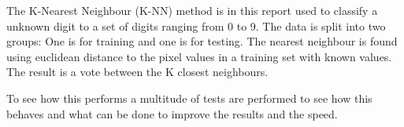 

The K-Nearest Neighbour (K-NN) method is in this report used to classify a unknown digit to a set of digits ranging from 0 to 9.
The data is split into two groups: One is for training and one is for testing. 
The nearest neighbour is found using euclidean distance to the pixel values in a training set with known values.
The result is a vote between the K closest neighbours.

To see how this performs a multitude of tests are performed to see how this behaves and what can be done to improve the results and the speed.
